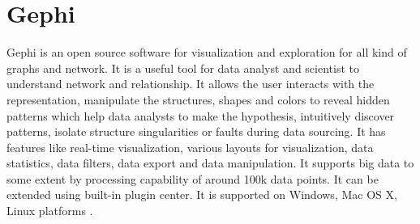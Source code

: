 \section{Gephi}
Gephi \cite{hid-sp18-402-gephi} is an open source software for
visualization and exploration for all kind of graphs and network. It
is a useful tool for data analyst and scientist to understand network
and relationship. It allows the user interacts with the
representation, manipulate the structures, shapes and colors to reveal
hidden patterns which help data analysts to make the hypothesis,
intuitively discover patterns, isolate structure singularities or
faults during data sourcing. It has features like real-time
visualization, various layouts for visualization, data statistics,
data filters, data export and data manipulation. It supports big data
to some extent by processing capability of around 100k data points. It
can be extended using built-in plugin center. It is supported on
Windows, Mac OS X, Linux platforms \cite{hid-sp18-402-gephiF}.
